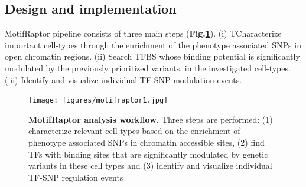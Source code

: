 \documentclass[a4paper, titlepage, openright]{book}
\newcommand{\motifraptor}{MotifRaptor\xspace}
\begin{document}
\subsection{Design and implementation}
\motifraptor pipeline consists of three main steps (\textbf{Fig.\ref{fig:motifraptor1}}). (i) TCharacterize important cell-types through the enrichment of the phenotype associated SNPs in open chromatin regions. (ii) Search TFBS whose binding potential is significantly modulated by the previously prioritized variants, in the investigated cell-types. (iii) Identify and visualize individual TF-SNP modulation events. 
\begin{figure}
	\centering
	\texttt{[image: figures/motifraptor1.jpg]}
	\caption[MotifRaptor analysis workflow]{\textbf{MotifRaptor analysis workflow.} Three steps are performed: (1) characterize
relevant cell types based on the enrichment of phenotype associated SNPs in chromatin accessible
sites, (2) find TFs with binding sites that are significantly modulated by genetic variants in these
cell types and (3) identify and visualize individual TF-SNP regulation events}
	\label{fig:motifraptor1}
\end{figure} 
\end{document}
